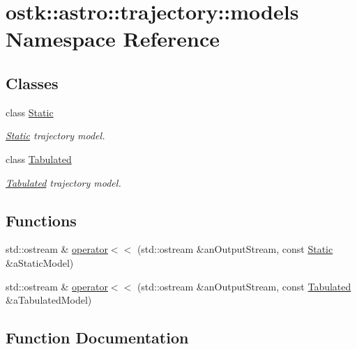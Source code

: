 \hypertarget{namespaceostk_1_1astro_1_1trajectory_1_1models}{}\section{ostk\+:\+:astro\+:\+:trajectory\+:\+:models Namespace Reference}
\label{namespaceostk_1_1astro_1_1trajectory_1_1models}
\subsection*{Classes}
\begin{DoxyCompactItemize}
\item 
class \hyperlink{classostk_1_1astro_1_1trajectory_1_1models_1_1_static}{Static}
\begin{DoxyCompactList}\small\item\em \hyperlink{classostk_1_1astro_1_1trajectory_1_1models_1_1_static}{Static} trajectory model. \end{DoxyCompactList}\item 
class \hyperlink{classostk_1_1astro_1_1trajectory_1_1models_1_1_tabulated}{Tabulated}
\begin{DoxyCompactList}\small\item\em \hyperlink{classostk_1_1astro_1_1trajectory_1_1models_1_1_tabulated}{Tabulated} trajectory model. \end{DoxyCompactList}\end{DoxyCompactItemize}
\subsection*{Functions}
\begin{DoxyCompactItemize}
\item 
std\+::ostream \& \hyperlink{namespaceostk_1_1astro_1_1trajectory_1_1models_acc744b9f63a8365d6d34bac040f761d7}{operator$<$$<$} (std\+::ostream \&an\+Output\+Stream, const \hyperlink{classostk_1_1astro_1_1trajectory_1_1models_1_1_static}{Static} \&a\+Static\+Model)
\item 
std\+::ostream \& \hyperlink{namespaceostk_1_1astro_1_1trajectory_1_1models_a933b83adb88de6c966eee5d228d8a31c}{operator$<$$<$} (std\+::ostream \&an\+Output\+Stream, const \hyperlink{classostk_1_1astro_1_1trajectory_1_1models_1_1_tabulated}{Tabulated} \&a\+Tabulated\+Model)
\end{DoxyCompactItemize}


\subsection{Function Documentation}
\mbox{\label{namespaceostk_1_1astro_1_1trajectory_1_1models_acc744b9f63a8365d6d34bac040f761d7}} 
